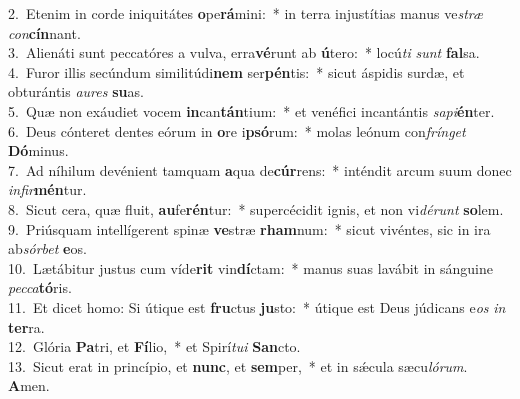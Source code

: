 {2.~}Etenim in corde iniquitátes \textbf{o}pe\textbf{rá}mini:~* in terra injustítias manus ve\textit{stræ} \textit{con}\textbf{cín}nant.\\
{3.~}Alienáti sunt peccatóres a vulva, erra\textbf{vé}runt ab \textbf{ú}tero:~* locú\textit{ti} \textit{sunt} \textbf{fal}sa.\\
{4.~}Furor illis secúndum similitúdi\textbf{nem} ser\textbf{pén}tis:~* sicut áspidis surdæ, et obturántis \textit{au}\textit{res} \textbf{su}as.\\
{5.~}Quæ non exáudiet vocem \textbf{in}can\textbf{tán}tium:~* et venéfici incantántis \textit{sa}\textit{pi}\textbf{én}ter.\\
{6.~}Deus cónteret dentes eórum in \textbf{o}re i\textbf{psó}rum:~* molas leónum con\textit{frín}\textit{get} \textbf{Dó}minus.\\
{7.~}Ad níhilum devénient tamquam \textbf{a}qua de\textbf{cúr}rens:~* inténdit arcum suum donec \textit{in}\textit{fir}\textbf{mén}tur.\\
{8.~}Sicut cera, quæ fluit, \textbf{au}fe\textbf{rén}tur:~* supercécidit ignis, et non vi\textit{dé}\textit{runt} \textbf{so}lem.\\
{9.~}Priúsquam intellígerent spinæ \textbf{ve}stræ \textbf{rham}num:~* sicut vivéntes, sic in ira ab\textit{sór}\textit{bet} \textbf{e}os.\\
{10.~}Lætábitur justus cum víde\textbf{rit} vin\textbf{dí}ctam:~* manus suas lavábit in sánguine \textit{pec}\textit{ca}\textbf{tó}ris.\\
{11.~}Et dicet homo: Si útique est \textbf{fru}ctus \textbf{ju}sto:~* útique est Deus júdicans e\textit{os} \textit{in} \textbf{ter}ra.\\
{12.~}Glória \textbf{Pa}tri, et \textbf{Fí}lio,~* et Spirí\textit{tu}\textit{i} \textbf{San}cto.\\
{13.~}Sicut erat in princípio, et \textbf{nunc}, et \textbf{sem}per,~* et in sǽcula sæcu\textit{ló}\textit{rum}. \textbf{A}men.\\
